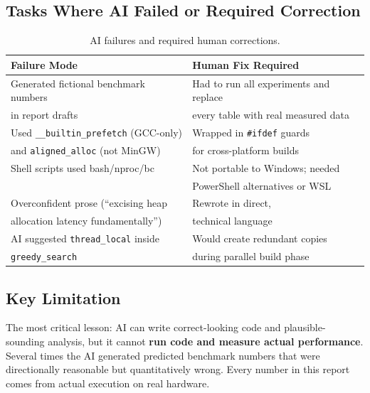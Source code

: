\documentclass[10pt]{article}
\begin{document}
\subsection{Tasks Where AI Failed or Required Correction}

\begin{table}[H]
\centering
\small
\begin{tabular}{ll}
\toprule
\textbf{Failure Mode} & \textbf{Human Fix Required} \\
\midrule
Generated fictional benchmark numbers & Had to run all experiments and replace \\
 in report drafts & every table with real measured data \\
\midrule
Used \texttt{\_\_builtin\_prefetch} (GCC-only) & Wrapped in \texttt{\#ifdef} guards \\
and \texttt{aligned\_alloc} (not MinGW) & for cross-platform builds \\
\midrule
Shell scripts used bash/nproc/bc & Not portable to Windows; needed \\
 & PowerShell alternatives or WSL \\
\midrule
Overconfident prose (``excising heap & Rewrote in direct, \\
allocation latency fundamentally'') & technical language \\
\midrule
AI suggested \texttt{thread\_local} inside & Would create redundant copies \\
\texttt{greedy\_search} & during parallel build phase \\
\bottomrule
\end{tabular}
\caption{AI failures and required human corrections.}
\label{tab:ai_failures}
\end{table}

\subsection{Key Limitation}

The most critical lesson: AI can write correct-looking code and plausible-sounding analysis, but it cannot \textbf{run code and measure actual performance}. Several times the AI generated predicted benchmark numbers that were directionally reasonable but quantitatively wrong. Every number in this report comes from actual execution on real hardware.

\end{document}
